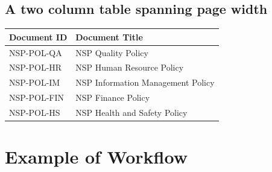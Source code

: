 \documentclass[a4paper,10pt]{article}
\begin{document}
 \subsection{A two column table spanning page width}
            
            \begin{center}
                 \vspace*{0.5 cm}
                
        \begin{tabular}{|  p{3.5cm}  |  p{13cm} |}
        
                                       \hline
\textbf{Document ID} & \textbf{Document Title}\\  \hline
NSP-POL-QA    & NSP Quality Policy    \\ \hline
NSP-POL-HR    & NSP Human Resource Policy  \\ \hline
NSP-POL-IM    & NSP Information Management Policy   \\ \hline
NSP-POL-FIN   & NSP Finance Policy  \\ \hline
NSP-POL-HS    & NSP Health and Safety Policy  \\ \hline

        \end{tabular}
    \vspace*{1 cm}
\end{center}

\section{Example of Workflow}
\end{document}
